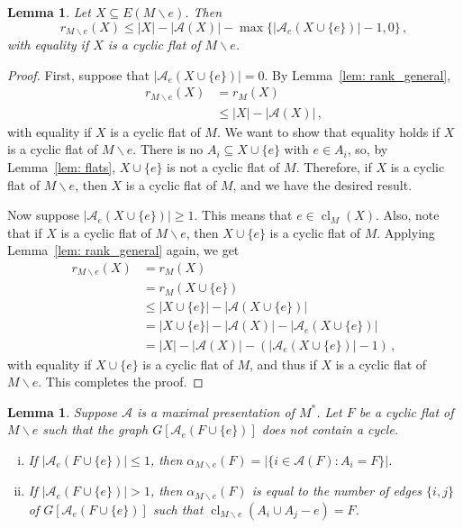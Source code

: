 \documentclass[11pt, reqno]{amsart}
\newtheorem{lemma}[theorem]{Lemma}
\DeclareMathOperator{\cl}{cl}
\begin{document}
\begin{lemma} \label{lem: flat deletion}
Let $X \subseteq E(M \backslash e)$. Then
$$
r_{M \backslash e}(X) \leq |X| - |\mathcal A(X)| - \max\{|\mathcal A_e(X \cup \{e\})| - 1, 0\} \,,
$$
with equality if $X$ is a cyclic flat of $M \backslash e$.
\end{lemma} 

\begin{proof}
First, suppose that $|\mathcal A_e(X \cup \{e\})| = 0$. By Lemma~\ref{lem: rank_general},
\begin{align*}
r_{M \backslash e}(X) &= r_M(X)\\
&\leq |X| - |\mathcal A(X)| \,,
\end{align*}
with equality if $X$ is a cyclic flat of $M$. We want to show that equality holds if $X$ is a cyclic flat of $M \backslash e$. There is no $A_i \subseteq X \cup \{e\}$ with $e \in A_i$, so, by Lemma~\ref{lem: flats}, $X \cup \{e\}$ is not a cyclic flat of $M$. Therefore, if $X$ is a cyclic flat of $M \backslash e$, then $X$ is a cyclic flat of $M$, and we have the desired result.

Now suppose $|\mathcal A_e(X \cup \{e\})| \geq 1$. This means that $e \in \cl_M(X)$. Also, note that if $X$ is a cyclic flat of $M \backslash e$, then $X \cup \{e\}$ is a cyclic flat of $M$. Applying Lemma~\ref{lem: rank_general} again, we get
\begin{align*}
r_{M \backslash e}(X) &= r_M(X) \\
&= r_M(X \cup \{e\}) \\
&\leq |X \cup \{e\}| - |\mathcal A(X \cup \{e\})| \\
&= |X \cup \{e\}| - |\mathcal A(X)| - |\mathcal A_e(X \cup \{e\})| \\
&= |X| - |\mathcal A(X)| - (|\mathcal A_e(X \cup \{e\})| - 1) \,,
\end{align*}
with equality if $X \cup \{e\}$ is a cyclic flat of $M$, and thus if $X$ is a cyclic flat of $M \backslash e$. This completes the proof.
\end{proof}

\begin{lemma} \label{lem: deletion alpha}
Suppose $\mathcal A$ is a maximal presentation of $M^*$. Let $F$ be a cyclic flat of $M \backslash e$ such that the graph $G[\mathcal A_e(F \cup \{e\})]$ does not contain a cycle. 
\begin{enumerate}[(i)]
\item If $|\mathcal A_e(F \cup \{e\})| \leq 1$, then $\alpha_{M \backslash e}(F) = |\{i \in \mathcal A(F) : A_i = F\}|$.

\item If $|\mathcal A_e(F \cup \{e\})| > 1$, then $\alpha_{M \backslash e}(F)$ is equal to the number of edges $\{i,j\}$ of $G[\mathcal A_e(F \cup \{e\})]$ such that $\cl_{M \backslash e}(A_i \cup A_j - e) = F$.
\end{enumerate}
\end{lemma}
\end{document}
